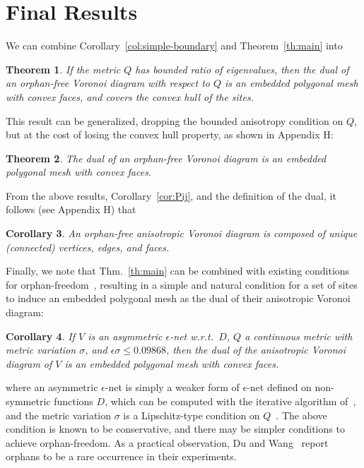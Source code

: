\documentclass[11pt]{article}
\newtheorem{theorem}{Theorem}[section]
\newtheorem{corollary}[theorem]{Corollary}
\begin{document}
\section{Final Results}\label{sec:gen}


We can combine Corollary~\ref{col:simple-boundary} and Theorem~\ref{th:main} into
\begin{theorem}\label{gamma}
If the metric $Q$ has bounded ratio of eigenvalues, then the dual of an orphan-free Voronoi diagram with respect to $Q$ is an embedded polygonal mesh with convex faces, and covers the convex hull of the sites. 
\end{theorem}

This result can be generalized, dropping the bounded anisotropy condition on $Q$, but at the cost of losing the convex hull property, as shown in Appendix H:
\begin{theorem}\label{th:final}
The dual of an orphan-free Voronoi diagram is an embedded polygonal mesh with convex faces. 
\end{theorem}

From the above results, Corollary~\ref{cor:Pij}, and the definition of the dual, it follows (see Appendix H) that


\begin{corollary}\label{uniqueVD}
An orphan-free anisotropic Voronoi diagram is composed of unique (connected) vertices, edges, and faces.
\end{corollary}





Finally, we note that Thm.~\ref{th:main} can be combined with existing conditions for orphan-freedom~\cite{avd}, resulting in a simple and natural condition for a set of sites to induce an embedded polygonal mesh as the dual of their anisotropic Voronoi diagram:
\begin{corollary}\label{cor:enet}
	If $V$ is an asymmetric $\epsilon$-net w.r.t.\ $D$, $Q$ a continuous metric with metric variation $\sigma$, 
		and $\epsilon\sigma \le 0.09868$, then the dual of the anisotropic Voronoi diagram of $V$
		is an embedded polygonal mesh with convex faces.\end{corollary}
where an asymmetric $\epsilon$-net is simply a weaker form of $\epsilon$-net defined on non-symmetric functions $D$, which can be computed with the iterative algorithm of~\cite{Gonz}, and the metric variation $\sigma$ is a Lipschitz-type condition  on $Q$~\cite{avd}. 
The above condition is known to be conservative, and there may be simpler conditions to achieve orphan-freedom. As a practical observation, Du and Wang~\cite{DW} report orphans to be a rare occurrence in their experiments. 
\end{document}

